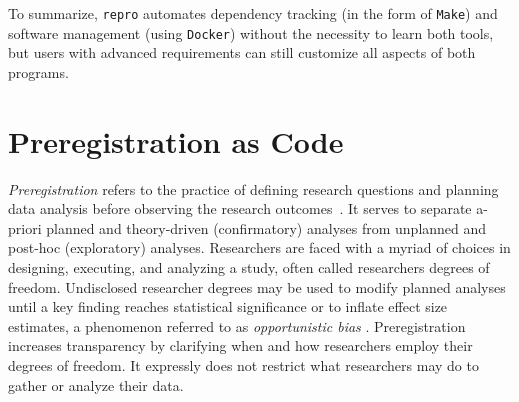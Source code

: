 \documentclass[psych,tutorial,accept,moreauthors,pdftex]{Definitions/mdpi}
\begin{document}
\begin{paracol}{2}
To summarize, \texttt{repro} automates dependency tracking (in the form
of \texttt{Make}) and software management (using \texttt{Docker})
without the necessity to learn both tools, but users with advanced
requirements can still customize all aspects of both programs.

\section{Preregistration as Code}\label{preregistration-as-code}

\emph{Preregistration} refers to the practice of defining research
questions and planning data analysis before observing the research
outcomes~\citep{NosekRevolution2018}. It serves to separate a-priori
planned and theory-driven (confirmatory) analyses from unplanned and
post-hoc (exploratory) analyses. Researchers are faced with a myriad of
choices in designing, executing, and analyzing a study, often called
researchers degrees of freedom. Undisclosed researcher degrees may be
used to modify planned analyses until a key finding reaches statistical
significance or to inflate effect size estimates, a phenomenon referred
to as \emph{opportunistic bias}
\citep{decosterOpportunisticBiasesTheir2015}. Preregistration increases
transparency by clarifying when and how researchers employ their degrees
of freedom. It expressly does not restrict what researchers may do to
gather or analyze their data.


\end{paracol}
\end{document}
